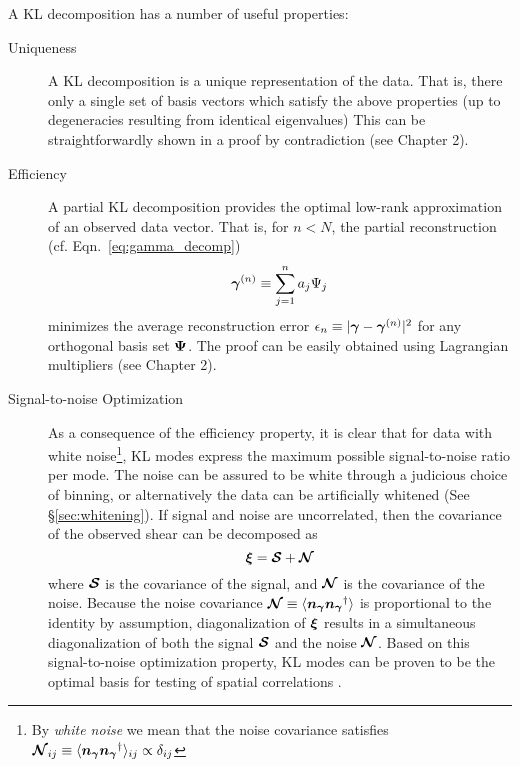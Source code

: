 A KL decomposition has a number of useful properties:
\begin{description}
  \item[Uniqueness] A KL decomposition is a unique representation of the data.
    That is, there only a single set of basis vectors which satisfy the above
    properties (up to degeneracies resulting from identical eigenvalues)
    This can be straightforwardly shown in a proof by contradiction
    (see Chapter 2).
  \item[Efficiency] A partial KL decomposition provides the
    optimal low-rank approximation of an observed data vector.  That is,
    for $n < N$, the partial reconstruction (cf. Eqn.~\ref{eq:gamma_decomp})
    \begin{equation}
      \boldsymbol{\gamma}^{(n)} \equiv \sum_{j=1}^n a_j \Psi_j
    \end{equation}
    minimizes the average reconstruction error
    $\epsilon_n \equiv |\boldsymbol{\gamma} - \boldsymbol{\gamma}^{(n)}|^2$
    for any orthogonal basis set $\boldsymbol{\Psi}$.  The proof can be easily
    obtained using Lagrangian multipliers (see Chapter 2).
  \item[Signal-to-noise Optimization] As a consequence of the efficiency
    property, it is clear that for data with white noise\footnote{
    By \textit{white noise} we mean that the noise covariance satisfies
    $\boldsymbol{\mathcal{N}}_{ij} \equiv 
    \langle\boldsymbol{n_\gamma}\boldsymbol{n_\gamma}^\dagger\rangle_{ij} 
    \propto \delta_{ij}$}, KL modes express the
    maximum possible signal-to-noise ratio per mode.  The noise can be assured
    to be white through a judicious choice of binning, or alternatively
    the data can be artificially whitened (See \S\ref{sec:whitening}).
    If signal and noise are uncorrelated, then the covariance of the observed
    shear can be decomposed as
    \begin{equation}
      \boldsymbol{\xi} = \boldsymbol{\mathcal{S}} + \boldsymbol{\mathcal{N}}
    \end{equation}
    where $\boldsymbol{\mathcal{S}}$ is the covariance of the signal, and
    $\boldsymbol{\mathcal{N}}$ is the covariance of the noise.
    Because the noise covariance $\boldsymbol{\mathcal{N}} \equiv 
    \langle\boldsymbol{n_\gamma}\boldsymbol{n_\gamma}^\dagger\rangle$ is proportional
    to the identity by assumption, diagonalization of $\boldsymbol{\xi}$ results
    in a simultaneous diagonalization of both the signal $\boldsymbol{\mathcal{S}}$
    and the noise $\boldsymbol{\mathcal{N}}$.  Based on this signal-to-noise
    optimization property, KL modes can be proven to be the optimal basis
    for testing of spatial correlations \citep[see Appendix A of][]{Vogeley96}.
\end{description}

